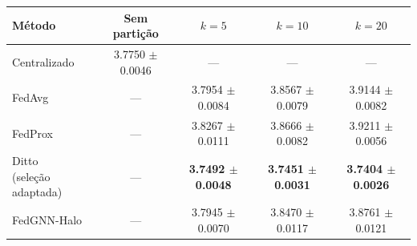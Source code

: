 
\begin{tabular}{lcccc}
\toprule
Método & Sem partição & $k=5$ & $k=10$ & $k=20$ \\
\midrule
Centralizado & \num{3.7750} $\pm$ \num{0.0046} & --- & --- & --- \\
\midrule
FedAvg & --- & \num{3.7954} $\pm$ \num{0.0084} & \num{3.8567} $\pm$ \num{0.0079} & \num{3.9144} $\pm$ \num{0.0082} \\
FedProx & --- & \num{3.8267} $\pm$ \num{0.0111} & \num{3.8666} $\pm$ \num{0.0082} & \num{3.9211} $\pm$ \num{0.0056} \\
\shortstack[l]{Ditto\\(seleção adaptada)} & --- & \textbf{\boldmath\sisetup{mode=text,detect-weight=true}\num{3.7492} $\pm$ \num{0.0048}} & \textbf{\boldmath\sisetup{mode=text,detect-weight=true}\num{3.7451} $\pm$ \num{0.0031}} & \textbf{\boldmath\sisetup{mode=text,detect-weight=true}\num{3.7404} $\pm$ \num{0.0026}} \\
FedGNN-Halo & --- & \num{3.7945} $\pm$ \num{0.0070} & \num{3.8470} $\pm$ \num{0.0117} & \num{3.8761} $\pm$ \num{0.0121} \\
\bottomrule
\end{tabular}
